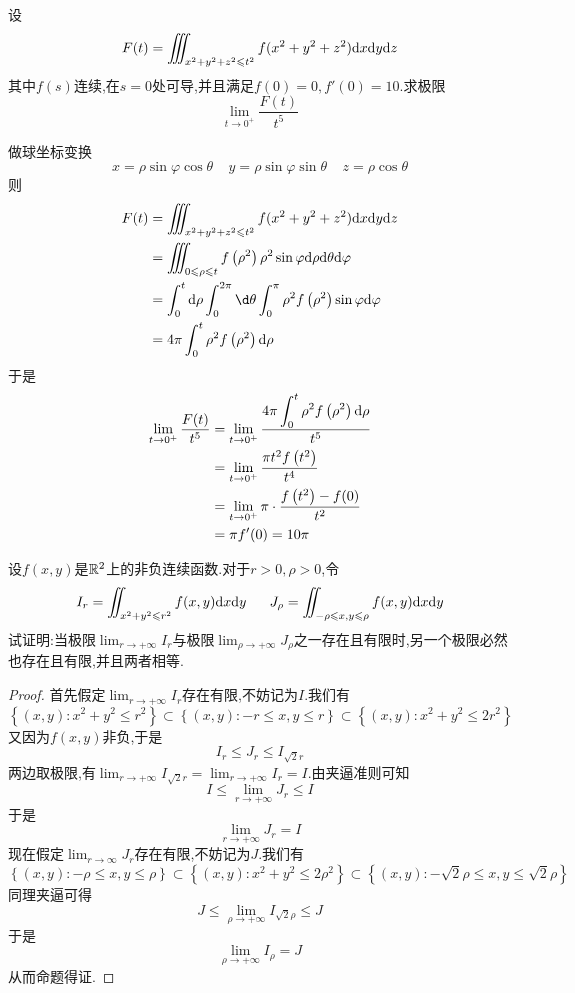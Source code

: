 \documentclass{ctexart}
\begin{document}
\begin{problem}[6.(10\songti{分})]
    设
    \[F(t)=\iiint_{x^2+y^2+z^2\leqslant t^2}f(x^2+y^2+z^2)\mathrm{d} x\mathrm{d} y\mathrm{d} z\]
    其中$f(s)$连续,在$s=0$处可导,并且满足$f(0)=0,f'(0)=10$.求极限
    \[\lim_{t\to0^+}\dfrac{F(t)}{t^5}\]

\end{problem}
\begin{solution}
    做球坐标变换
    \[x=\rho\sin\varphi\cos\theta\ \ \ \ \ y=\rho\sin\varphi\sin\theta\ \ \ \ \ z=\rho\cos\theta\]
    则
    \[\begin{aligned}
        F(t)
        &= \iiint_{x^2+y^2+z^2\leqslant t^2}f(x^2+y^2+z^2)\dx\di y\di z \\
        &= \iiint_{0\leqslant\rho\leqslant t}f\left(\rho^2\right)\rho^2\sin\varphi\di\rho\di\theta\di\varphi \\
        &= \int_0^t\di\rho\int_0^{2\pi}\d\theta\int_0^{\pi}\rho^2f\left(\rho^2\right)\sin\varphi\di\varphi \\
        &= 4\pi\int_0^{t}\rho^2f\left(\rho^2\right)\di\rho
    \end{aligned}\]
    于是
    \[\begin{aligned}
        \lim_{t\to0^+}\dfrac{F(t)}{t^5}
        &= \lim_{t\to0^+}\dfrac{\displaystyle4\pi\int_0^{t}\rho^2f\left(\rho^2\right)\mathrm{d}\rho}{t^5} \\
        &= \lim_{t\to0^+}\dfrac{\pi t^2f\left(t^2\right)}{t^4} \\
        &= \lim_{t\to0^+}\pi\cdot\dfrac{f\left(t^2\right)-f(0)}{t^2} \\
        &= \pi f'(0)=10\pi
    \end{aligned}\]

\end{solution}
\begin{problem}[7.(10\songti{分})]
    设$f(x,y)$是$\mathbb{R}^2$上的非负连续函数.对于$r>0,\rho>0$,令
    \[I_r=\iint_{x^2+y^2\leqslant r^2}f(x,y)\mathrm{d} x\mathrm{d} y\ \ \ \ \ J_{\rho}=\iint_{-\rho\leqslant x,y\leqslant\rho}f(x,y)\mathrm{d} x\mathrm{d} y\]
    试证明:当极限$\displaystyle\lim_{r\to+\infty}I_r$与极限$\displaystyle\lim_{\rho\to+\infty}J_\rho$之一存在且有限时,另一个极限必然也存在且有限,并且两者相等.
\end{problem}
\begin{proof}
    首先假定$\displaystyle\lim_{r\to+\infty}I_r$存在有限,不妨记为$I$.我们有
    \[\left\{(x,y):x^2+y^2\leqslant r^2\right\}
    \subset\left\{(x,y):-r\leqslant x,y\leqslant r\right\}
    \subset\left\{(x,y):x^2+y^2\leqslant 2r^2\right\}\]
    又因为$f(x,y)$非负,于是
    \[I_r\leqslant J_r\leqslant I_{\sqrt{2}r}\]
    两边取极限,有$\displaystyle\lim_{r\to+\infty}I_{\sqrt2r}=\lim_{r\to+\infty}I_{r}=I$.由夹逼准则可知
    \[I\leqslant\lim_{r\to+\infty}J_r\leqslant I\]
    于是
    \[\lim_{r\to+\infty}J_r=I\]
    现在假定$\displaystyle\lim_{r\to\infty}J_r$存在有限,不妨记为$J$.我们有
    \[\left\{(x,y):-\rho\leqslant x,y\leqslant\rho\right\}
    \subset\left\{(x,y):x^2+y^2\leqslant 2\rho^2\right\}
    \subset\left\{(x,y):-\sqrt2\rho\leqslant x,y\leqslant\sqrt2\rho\right\}\]
    同理夹逼可得
    \[J\leqslant\lim_{\rho\to+\infty}I_{\sqrt2\rho}\leqslant J\]
    于是
    \[\lim_{\rho\to+\infty}I_{\rho}=J\]
    从而命题得证.
\end{proof}
\end{document}
